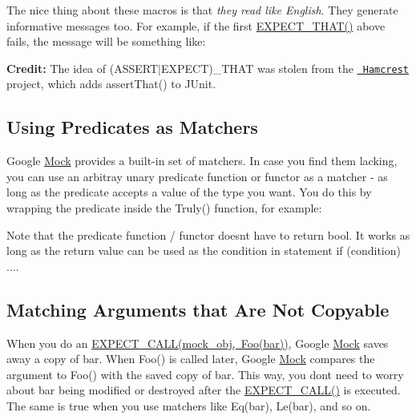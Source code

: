 The nice thing about these macros is that {\itshape they read like English}. They generate informative messages too. For example, if the first {\ttfamily \mbox{\hyperlink{gmock-matchers_8h_ac31e206123aa702e1152bb2735b31409}{E\+X\+P\+E\+C\+T\+\_\+\+T\+H\+A\+T()}}} above fails, the message will be something like\+:


\begin{DoxyCode}{0}
\end{DoxyCode}


{\bfseries{Credit\+:}} The idea of {\ttfamily (A\+S\+S\+E\+R\+T$\vert$\+E\+X\+P\+E\+CT)\+\_\+\+T\+H\+AT} was stolen from the \href{https://github.com/hamcrest/}{\texttt{ Hamcrest}} project, which adds {\ttfamily assert\+That()} to J\+Unit.

\subsection*{Using Predicates as Matchers}

Google \mbox{\hyperlink{classMock}{Mock}} provides a built-\/in set of matchers. In case you find them lacking, you can use an arbitray unary predicate function or functor as a matcher -\/ as long as the predicate accepts a value of the type you want. You do this by wrapping the predicate inside the {\ttfamily Truly()} function, for example\+:


\begin{DoxyCode}{0}
\DoxyCodeLine{}
\DoxyCodeLine{}
\end{DoxyCode}


Note that the predicate function / functor doesn\textquotesingle{}t have to return {\ttfamily bool}. It works as long as the return value can be used as the condition in statement {\ttfamily if (condition) ...}.

\subsection*{Matching Arguments that Are Not Copyable}

When you do an {\ttfamily \mbox{\hyperlink{gmock-spec-builders_8h_a535a6156de72c1a2e25a127e38ee5232}{E\+X\+P\+E\+C\+T\+\_\+\+C\+A\+L\+L(mock\+\_\+obj, Foo(bar))}}}, Google \mbox{\hyperlink{classMock}{Mock}} saves away a copy of {\ttfamily bar}. When {\ttfamily Foo()} is called later, Google \mbox{\hyperlink{classMock}{Mock}} compares the argument to {\ttfamily Foo()} with the saved copy of {\ttfamily bar}. This way, you don\textquotesingle{}t need to worry about {\ttfamily bar} being modified or destroyed after the {\ttfamily \mbox{\hyperlink{gmock-spec-builders_8h_a535a6156de72c1a2e25a127e38ee5232}{E\+X\+P\+E\+C\+T\+\_\+\+C\+A\+L\+L()}}} is executed. The same is true when you use matchers like {\ttfamily Eq(bar)}, {\ttfamily Le(bar)}, and so on.

